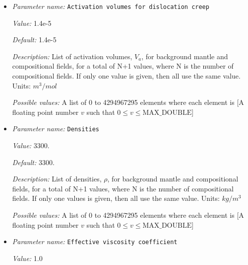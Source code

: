 \begin{itemize}
{\it Description:} List of activation volumes, $V_a$, for background mantle and compositional fields, for a total of N+1 values, where N is the number of compositional fields. If only one value is given, then all use the same value.  Units: $m^3 / mol$


{\it Possible values:} A list of 0 to 4294967295 elements where each element is [A floating point number $v$ such that $0 \leq v \leq \text{MAX\_DOUBLE}$]
\item {\it Parameter name:} {\tt Activation volumes for dislocation creep}
\label{parameters:Material model/Diffusion dislocation/Activation volumes for dislocation creep}


{\it Value:} 1.4e-5


{\it Default:} 1.4e-5


{\it Description:} List of activation volumes, $V_a$, for background mantle and compositional fields, for a total of N+1 values, where N is the number of compositional fields. If only one value is given, then all use the same value.  Units: $m^3 / mol$


{\it Possible values:} A list of 0 to 4294967295 elements where each element is [A floating point number $v$ such that $0 \leq v \leq \text{MAX\_DOUBLE}$]
\item {\it Parameter name:} {\tt Densities}
\label{parameters:Material model/Diffusion dislocation/Densities}


{\it Value:} 3300.


{\it Default:} 3300.


{\it Description:} List of densities, $\rho$, for background mantle and compositional fields, for a total of N+1 values, where N is the number of compositional fields. If only one values is given, then all use the same value.  Units: $kg / m^3$


{\it Possible values:} A list of 0 to 4294967295 elements where each element is [A floating point number $v$ such that $0 \leq v \leq \text{MAX\_DOUBLE}$]
\item {\it Parameter name:} {\tt Effective viscosity coefficient}
\label{parameters:Material model/Diffusion dislocation/Effective viscosity coefficient}


{\it Value:} 1.0



\end{itemize}
